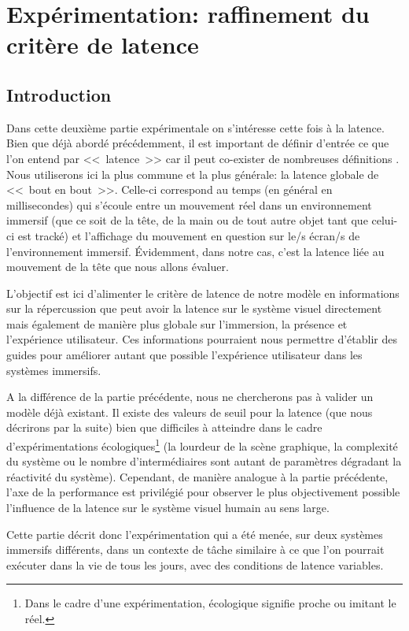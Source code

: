 \part{Expérimentation: raffinement du critère de latence}

\chapter*{Introduction}
\par Dans cette deuxième partie expérimentale on s'intéresse cette fois à la latence. Bien que déjà abordé précédemment, il est important de définir d'entrée ce que l'on entend par <<~latence~>> car il peut co-exister de nombreuses définitions \citep{papadakis_system_2011, hale_handbook_2015, watson_effects_1998}. Nous utiliserons ici la plus commune et la plus générale: la latence globale de <<~bout en bout~>>. Celle-ci correspond au temps (en général en millisecondes) qui s'écoule entre un mouvement réel dans un environnement immersif (que ce soit de la tête, de la main ou de tout autre objet tant que celui-ci est tracké) et l'affichage du mouvement en question sur le/s écran/s de l'environnement immersif. Évidemment, dans notre cas, c'est la latence liée au mouvement de la tête que nous allons évaluer.

\par L'objectif est ici d'alimenter le critère de latence de notre modèle en informations sur la répercussion que peut avoir la latence sur le système visuel directement mais également de manière plus globale sur l'immersion, la présence et l'expérience utilisateur. Ces informations pourraient nous permettre d'établir des guides pour améliorer autant que possible l'expérience utilisateur dans les systèmes immersifs.

\par A la différence de la partie précédente, nous ne chercherons pas à valider un modèle déjà existant. Il existe des valeurs de seuil pour la latence (que nous décrirons par la suite) bien que difficiles à atteindre dans le cadre d'expérimentations écologiques\footnote{Dans le cadre d'une expérimentation, écologique signifie proche ou imitant le réel.} (la lourdeur de la scène graphique, la complexité du système ou le nombre d'intermédiaires sont autant de paramètres dégradant la réactivité du système). Cependant, de manière analogue à la partie précédente, l'axe de la performance est privilégié pour observer le plus objectivement possible l'influence de la latence sur le système visuel humain au sens large.

\par Cette partie décrit donc l'expérimentation qui a été menée, sur deux systèmes immersifs différents, dans un contexte de tâche similaire à ce que l'on pourrait exécuter dans la vie de tous les jours, avec des conditions de latence variables.